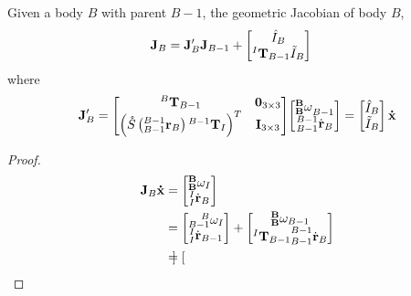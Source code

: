 \begin{lemma} \label{lem:recurse_jacobian}
	Given a body $B$ with parent $B - 1$, the geometric Jacobian of body $B$,
	\begin{align*}
		\mathbf{J}_B & = \mathbf{J}_B' \mathbf{J}_{B-1} + \begin{bmatrix} 
		{\hat{I}_B} \\
		{{^I\mathbf{T}_{B-1}}\Tilde{I}_B}
		\end{bmatrix}
	\end{align*}
	\noindent where 
	\begin{align*}
		\begin{split}
		\mathbf{J}_B' = \begin{bmatrix}
		{^B\mathbf{T}_{B - 1}}                                       & {\mathbf{0}}_{3 \times 3} \\
		\left (\mathring{S}\left(^{B-1}_{B-1}\mathbf{r}_B\right){^{B-1}\mathbf{T}_{I}} \right )^T & {\mathbf{I}}_{3 \times 3}  
		\end{bmatrix}
		\end{split}
		\begin{split}
		\begin{bmatrix}
		{^\mathbf{B}_\mathbf{B}\omega}_{B-1} \\
		{^{B-1}_{B-1}}\dot{\mathbf{r}}_B 
		\end{bmatrix} = 
		\begin{bmatrix}
		\hat{I}_B\\
		\Tilde{I}_B\\
		\end{bmatrix}  {\mathbf{\dot{x}}}
		\end{split}
	\end{align*}
	\begin{proof}
		\begin{align*}
			\mathbf{J}_B {\mathbf{\dot{x}}}                                           & = \begin{bmatrix}  
			{^\mathbf{B}_\mathbf{B}\omega_I} \\
			{^I_I\dot{\mathbf{r}}_B}
			\end{bmatrix} \\
			                                                     & = \begin{bmatrix}  
			{{_{B - 1}^{~~~B}\omega_{I}}} \\
			{^{I}_{I}\dot{\mathbf{r}}_{B - 1}}
			\end{bmatrix} + \begin{bmatrix}
			{^\mathbf{B}_\mathbf{B}\omega_{B - 1}} \\
			{{^I\mathbf{T}_{B-1}}^{B - 1}_{B - 1}\dot{\mathbf{r}}_B}
			\end{bmatrix} \\
			                                                     & = \begin{bmatrix}  

\end{bmatrix}
\end{align*}
\end{proof}
\end{lemma}
